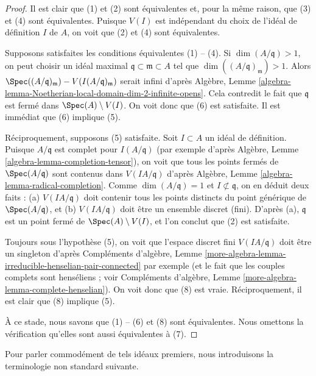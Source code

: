 \begin{proof}
Il est clair que (1) et (2) sont équivalentes et, pour la même raison,
que (3) et (4) sont équivalentes.
Puisque $V(I)$ est indépendant du choix de l'idéal de définition
$I$ de $A$, on voit que (2) et (4) sont équivalentes.

\medskip\noindent
Supposons satisfaites les conditions équivalentes (1) -- (4).
Si $\dim(A/\mathfrak q) > 1$, on peut choisir un idéal maximal
$\mathfrak q \subset \mathfrak m \subset A$
tel que $\dim((A/\mathfrak q)_\mathfrak m) > 1$.
Alors $\Spec((A/\mathfrak q)_\mathfrak m) - V(I(A/\mathfrak q)_\mathfrak m)$
serait infini d'après Algèbre, Lemme
\ref{algebra-lemma-Noetherian-local-domain-dim-2-infinite-opens}.
Cela contredit le fait que $\mathfrak q$ est fermé dans
$\Spec(A) \setminus V(I)$.
On voit donc que (6) est satisfaite. Il est immédiat que (6) implique (5).

\medskip\noindent
Réciproquement, supposons (5) satisfaite. Soit $I \subset A$ un idéal de définition.
Puisque $A/\mathfrak q$ est complet
pour $I(A/\mathfrak q)$ (par exemple d'après
Algèbre, Lemme \ref{algebra-lemma-completion-tensor}),
on voit que tous les points fermés de $\Spec(A/\mathfrak q)$ sont
contenus dans $V(IA/\mathfrak q)$ d'après
Algèbre, Lemme \ref{algebra-lemma-radical-completion}.
Comme $\dim(A/\mathfrak q) = 1$ et $I \not \subset \mathfrak q$,
on en déduit deux faits : (a) $V(IA/\mathfrak q)$ doit contenir
tous les points distincts du point générique de $\Spec(A/\mathfrak q)$, et
(b) $V(IA/\mathfrak q)$ doit être un ensemble discret (fini).
D'après (a), $\mathfrak q$ est un point fermé de
$\Spec(A) \setminus V(I)$, et l'on conclut que (2) est satisfaite.

\medskip\noindent
Toujours sous l'hypothèse (5), on voit que l'espace discret fini
$V(IA/\mathfrak q)$ doit être un singleton d'après Compléments d'algèbre, Lemme
\ref{more-algebra-lemma-irreducible-henselian-pair-connected}
par exemple (et le fait que les couples complets sont henséliens ; voir
Compléments d'algèbre, Lemme \ref{more-algebra-lemma-complete-henselian}).
On voit donc que (8) est vraie.
Réciproquement, il est clair que (8) implique (5).

\medskip\noindent
À ce stade, nous savons que (1) -- (6) et (8) sont équivalentes.
Nous omettons la vérification qu'elles sont aussi équivalentes à (7).
\end{proof}

\noindent
Pour parler commodément de tels idéaux premiers, nous introduisons
la terminologie non standard suivante.


